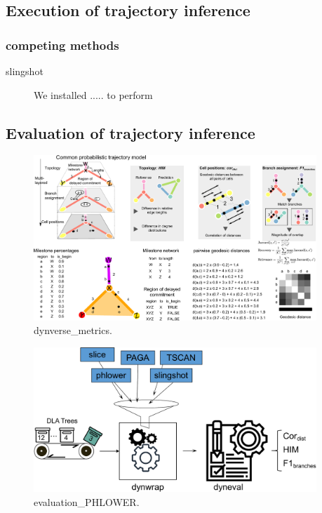 \subsection{Execution of trajectory inference}
\subsubsection{competing methods}
\begin{description}
	\item[slingshot] We installed ..... to perform	
\end{description}

\subsection{Evaluation of trajectory inference}
\begin{figure}[!ht]
	\centering
	\includegraphics[width=0.95\textwidth]{dynverse_metrics/fig}
	\vspace{0.1cm}
	\caption[dynverse\_metrics]{
	dynverse\_metrics.}
	\label{fig:dynverse_metrics}
\end{figure}

\begin{figure}[!ht]
	\centering
	\includegraphics[width=0.95\textwidth]{evaluation_PHLOWER/fig}
	\vspace{0.1cm}
	\caption[evaluation\_PHLOWER]{
	evaluation\_PHLOWER.}
	\label{fig:evaluation_PHLOWER}
\end{figure}


